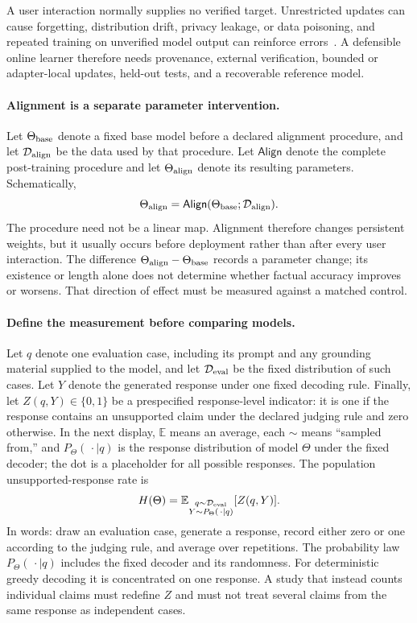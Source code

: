 \documentclass[
  aps,
  reprint,
  superscriptaddress,
  floatfix,
  nofootinbib,
  longbibliography
]{revtex4-2}
\newcommand{\E}{\mathbb{E}}
\begin{document}
A user interaction normally supplies no verified target.  Unrestricted
updates can cause forgetting, distribution drift, privacy leakage, or data
poisoning, and repeated training on unverified model output can reinforce
errors~\cite{herel2024collapse}.  A defensible online learner therefore needs
provenance, external verification, bounded or adapter-local updates, held-out
tests, and a recoverable reference model.

\paragraph{Alignment is a separate parameter intervention.}
Let $\Theta_{\rm base}$ denote a fixed base model before a declared alignment
procedure, and let $\mathcal D_{\rm align}$ be the data used by that procedure.
Let $\mathsf{Align}$ denote the complete post-training procedure and let
$\Theta_{\rm align}$ denote its resulting parameters.  Schematically,
\begin{equation}
\label{eq:app-alignment-map}
\Theta_{\rm align}
=\mathsf{Align}(\Theta_{\rm base};\mathcal D_{\rm align}).
\end{equation}
The procedure need not be a linear map.  Alignment therefore changes persistent weights, but
it usually occurs before deployment rather than after every user interaction.
The difference $\Theta_{\rm align}-\Theta_{\rm base}$ records a parameter
change; its existence or length alone does not determine whether factual
accuracy improves or worsens.  That direction of effect must be measured
against a matched control.

\paragraph{Define the measurement before comparing models.}
Let $q$ denote one evaluation case, including its prompt and any grounding
material supplied to the model, and let $\mathcal D_{\rm eval}$ be the fixed
distribution of such cases.  Let $Y$ denote the generated response under one
fixed decoding rule.  Finally, let $Z(q,Y)\in\{0,1\}$ be a prespecified
response-level indicator: it is one if the response contains an unsupported
claim under the declared judging rule and zero otherwise.  In the next display,
$\E$ means an average, each $\sim$ means ``sampled from,'' and
$P_\Theta(\,\cdot\mid q)$ is the response distribution of model $\Theta$ under
the fixed decoder; the dot is a placeholder for all possible responses.  The
population unsupported-response rate is
\begin{equation}
\label{eq:app-hallucination-population}
H(\Theta)
=\E_{\substack{q\sim\mathcal D_{\rm eval}\\
Y\sim P_\Theta(\,\cdot\mid q)}}[Z(q,Y)].
\end{equation}
In words: draw an evaluation case, generate a response, record either zero or
one according to the judging rule, and average over repetitions.
The probability law $P_\Theta(\,\cdot\mid q)$ includes the fixed decoder and
its randomness.  For deterministic greedy decoding it is concentrated on one
response.  A study that instead counts individual claims must redefine $Z$ and
must not treat several claims from the same response as independent cases.
\end{document}
